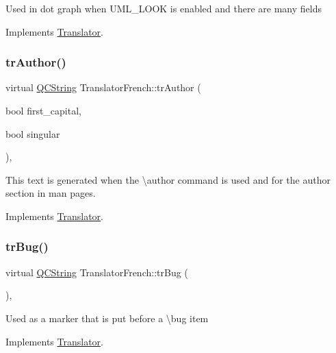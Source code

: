 Used in dot graph when U\+M\+L\+\_\+\+L\+O\+OK is enabled and there are many fields 

Implements \mbox{\hyperlink{class_translator}{Translator}}.

\mbox{\label{class_translator_french_a870aa40e935c46fefa8b4e55bba06d86}} 
\subsubsection{\texorpdfstring{trAuthor()}{trAuthor()}}
{\footnotesize\ttfamily virtual \mbox{\hyperlink{class_q_c_string}{Q\+C\+String}} Translator\+French\+::tr\+Author (\begin{DoxyParamCaption}\item[{bool}]{first\+\_\+capital,  }\item[{bool}]{singular }\end{DoxyParamCaption})\hspace{0.3cm}{\ttfamily [inline]}, {\ttfamily [virtual]}}

This text is generated when the \textbackslash{}author command is used and for the author section in man pages. 

Implements \mbox{\hyperlink{class_translator}{Translator}}.

\mbox{\label{class_translator_french_ac47bc6769cc643171537190cb9598625}} 
\subsubsection{\texorpdfstring{trBug()}{trBug()}}
{\footnotesize\ttfamily virtual \mbox{\hyperlink{class_q_c_string}{Q\+C\+String}} Translator\+French\+::tr\+Bug (\begin{DoxyParamCaption}{ }\end{DoxyParamCaption})\hspace{0.3cm}{\ttfamily [inline]}, {\ttfamily [virtual]}}

Used as a marker that is put before a \textbackslash{}bug item 

Implements \mbox{\hyperlink{class_translator}{Translator}}.

\mbox{\label{class_translator_french_abe91689b7af07f0b6eab2ba2472c8ab8}} 
